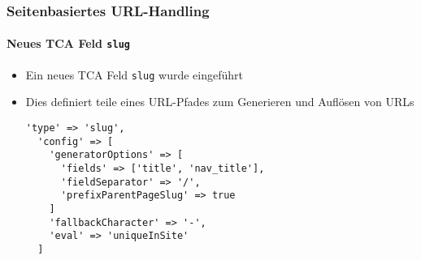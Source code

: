 
\begin{frame}[fragile]
	\frametitle{Seitenbasiertes URL-Handling}
	\framesubtitle{Neues TCA Feld \texttt{slug}}

	\lstset{basicstyle=\smaller\ttfamily}

	\begin{itemize}
		\item Ein neues TCA Feld \texttt{slug} wurde eingeführt
		\item Dies definiert teile eines URL-Pfades zum Generieren und Auflösen von URLs

		\begin{lstlisting}
'type' => 'slug',
  'config' => [
    'generatorOptions' => [
      'fields' => ['title', 'nav_title'],
      'fieldSeparator' => '/',
      'prefixParentPageSlug' => true
    ]
    'fallbackCharacter' => '-',
    'eval' => 'uniqueInSite'
  ]
		\end{lstlisting}
	\end{itemize}

\end{frame}


